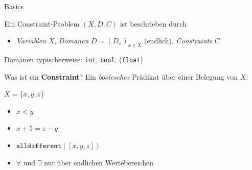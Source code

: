 \documentclass[handout,10pt,xcolor={dvipsnames},fleqn]{beamer}
\begin{document}
\begin{frame}{Basics}
\begin{definition}
Ein \alert{Constraint-Problem} $(X, D, C)$ ist beschrieben durch
\begin{itemize}
  \item \emph{Variablen} $X$,
\emph{Domänen} $D = (D_x)_{x \in X}$ (endlich),
\emph{Constraints} $C$ 
\end{itemize} 

\end{definition}
\pause

Domänen typischerweise: \texttt{int}, \texttt{bool}, (\texttt{float})
\vspace*{2ex}

Was ist ein \textbf{Constraint}? Ein \emph{boolesches} Prädikat über einer Belegung von $X$:

$X = \{x, y, z \}$
\begin{itemize}
\item $x < y$
\item $x + 5 = z - y$
\item $\texttt{alldifferent}([x,y,z])$
\item $\forall$ und $\exists$ nur über endlichen Wertebereichen 
\end{itemize}
\end{frame} 
%
%
%
%
%
\end{document}
